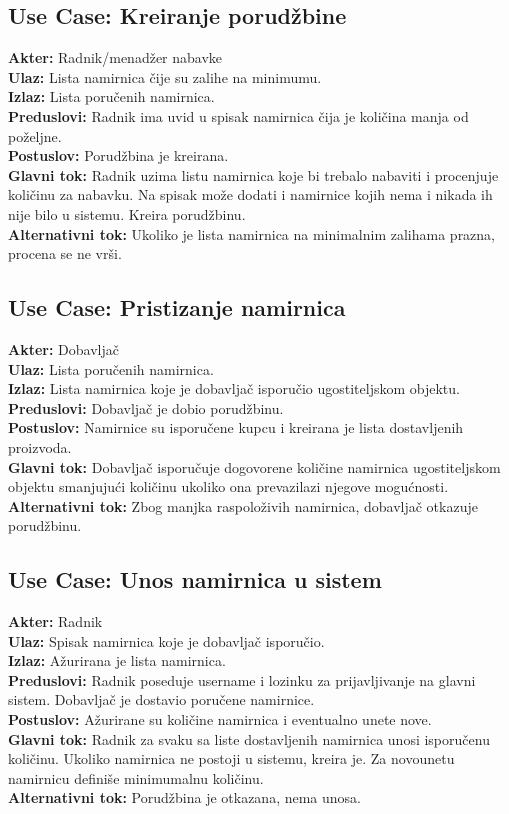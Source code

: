 \documentclass{article}
\begin{document}
\subsection{\textbf{Use Case}: Kreiranje porudžbine}
\textbf{Akter:} Radnik/menadžer nabavke\\
\textbf{Ulaz:} Lista namirnica čije su zalihe na minimumu.\\
\textbf{Izlaz:} Lista poručenih namirnica.\\
\textbf{Preduslovi:} Radnik ima uvid u spisak namirnica čija je količina manja od poželjne.\\
\textbf{Postuslov:} Porudžbina je kreirana.\\
\textbf{Glavni tok:} Radnik uzima listu namirnica koje bi trebalo nabaviti i procenjuje količinu za nabavku. Na spisak može dodati i namirnice kojih nema i nikada ih nije bilo u sistemu. Kreira porudžbinu.\\
\textbf{Alternativni tok:} Ukoliko je lista namirnica na minimalnim zalihama prazna, procena se ne vrši.\\

\subsection{\textbf{Use Case}:  Pristizanje namirnica}
\textbf{Akter:} Dobavljač\\
\textbf{Ulaz:} Lista poručenih namirnica.\\
\textbf{Izlaz:} Lista namirnica koje je dobavljač isporučio ugostiteljskom objektu.\\
\textbf{Preduslovi:} Dobavljač je dobio porudžbinu.\\
\textbf{Postuslov:} Namirnice su isporučene kupcu i kreirana je lista dostavljenih proizvoda.\\
\textbf{Glavni tok:} Dobavljač isporučuje dogovorene količine namirnica ugostiteljskom objektu smanjujući količinu ukoliko ona prevazilazi njegove mogućnosti.\\
\textbf{Alternativni tok:} Zbog manjka raspoloživih namirnica, dobavljač otkazuje porudžbinu.\\

\subsection{\textbf{Use Case}: Unos namirnica u sistem}
\textbf{Akter:} Radnik\\
\textbf{Ulaz:} Spisak namirnica koje je dobavljač isporučio.\\
\textbf{Izlaz:} Ažurirana je lista namirnica.\\
\textbf{Preduslovi:} Radnik poseduje username i lozinku za prijavljivanje na glavni sistem. Dobavljač je dostavio poručene namirnice.\\
\textbf{Postuslov:} Ažurirane su količine namirnica i eventualno unete nove.\\
\textbf{Glavni tok:} Radnik za svaku sa liste dostavljenih namirnica unosi isporučenu količinu. Ukoliko namirnica ne postoji u sistemu, kreira je. Za novounetu namirnicu definiše minimumalnu količinu.\\
\textbf{Alternativni tok:} Porudžbina je otkazana, nema unosa.\\
\end{document}
